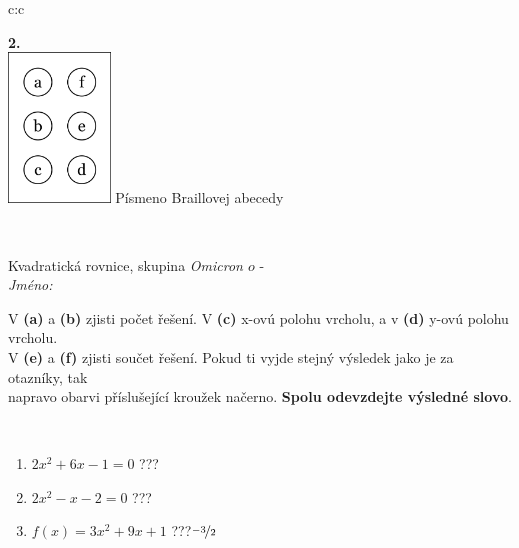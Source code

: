 \documentclass[10pt]{report}
\newcommand\omicron{o}
\begin{document}
\begin{tabular}{c:c}
\begin{minipage}[c][104.5mm][t]{0.5\linewidth}
\begin{center}
\begin{minipage}{0.20\linewidth}
\begin{center}
{\Huge\bfseries 2.} \\[2mm]
\includegraphics[height=40mm]{../images/braille.png}
{\small Písmeno Braillovej abecedy}
\end{center}
\end{minipage}
\end{center}
\end{minipage}
\\ \hdashline
\begin{minipage}[c][104.5mm][t]{0.5\linewidth}
\begin{center}
\vspace{7mm}
{\huge Kvadratická rovnice, skupina \textit{Omicron $\omicron$} -}\\[5mm]
\textit{Jméno:}\phantom{xxxxxxxxxxxxxxxxxxxxxxxxxxxxxxxxxxxxxxxxxxxxxxxxxxxxxxxxxxxxxxxxx}\\[5mm]
\begin{minipage}{0.95\linewidth}
\begin{center}
V \textbf{(a)} a \textbf{(b)} zjisti počet řešení. V \textbf{(c)} x-ovú polohu vrcholu, a v \textbf{(d)} y-ovú polohu vrcholu.\\V \textbf{(e)} a \textbf{(f)} zjisti součet řešení. Pokud ti vyjde stejný výsledek jako je za otazníky, tak\\napravo obarvi příslušející kroužek načerno. \textbf{Spolu odevzdejte výsledné slovo}.
\end{center}
\end{minipage}
\\[1mm]
\begin{minipage}{0.79\linewidth}
\begin{center}
\begin{varwidth}{\linewidth}
\begin{enumerate}
\Large
\item $2x^2+6x-1=0$\quad \dotfill\; ???\;\dotfill {}
\item $2x^2-x-2=0$\quad \dotfill\; ???\;\dotfill {}
\item $f(x)=3x^2+9x+1$\quad \dotfill\; ???\;\dotfill \quad $\nicefrac{-3}{2}$

\end{enumerate}
\end{varwidth}
\end{center}
\end{minipage}
\end{center}
\end{minipage}
\end{tabular}
\end{document}
